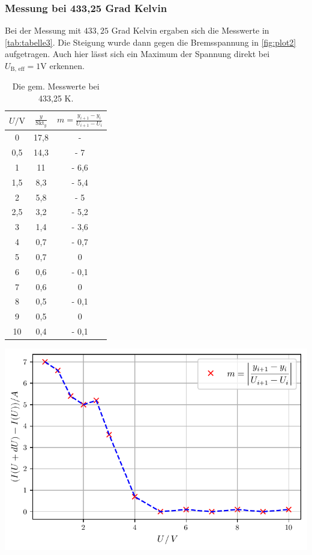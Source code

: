 \subsubsection*{Messung bei 433,25 Grad Kelvin}

Bei der Messung mit $433,25$ Grad Kelvin ergaben sich die Messwerte in \autoref{tab:tabelle3}.
Die Steigung wurde dann gegen die Bremsspannung in \autoref{fig:plot2} aufgetragen.
Auch hier lässt sich ein Maximum der Spannung direkt bei $U_{\text{B, eff}} = 1 \unit\V$ erkennen.

\begin{table}[ht]
  \begin{minipage}[b]{0.4\linewidth}
  \centering
  \begin{tabular}{c c c}
    \toprule
    $U / \unit\V$ & $\frac{y}{\text{Skt}_y}$ & $m  =\frac{y_{i+1} - y_{i}}{U_{i+1} - U_{i}}$ \\
    \midrule 
    0   & 17,8& - \\
    0,5 & 14,3& - 7 \\
    1   & 11  & -  6,6 \\ 
    1,5 & 8,3 & - 5,4 \\ 
    2   & 5,8 & - 5 \\  
    2,5 & 3,2 & - 5,2 \\ 
    3   & 1,4 & - 3,6 \\ 
    4   & 0,7 & - 0,7 \\
    5   & 0,7 & 0 \\  
    6   & 0,6 & - 0,1 \\ 
    7   & 0,6 & 0 \\ 
    8   & 0,5 & -  0,1 \\ 
    9   & 0,5 & 0 \\ 
    10  & 0,4 & -  0,1 \\
    \bottomrule
  \end{tabular}
    \caption{Die gem. Messwerte bei 433,25 K.}
    \label{tab:tabelle3}
  \end{minipage}\hfill
  \begin{minipage}[b]{0.45\linewidth}
  \centering
  \includegraphics[width=\linewidth]{build/plot2.pdf}
  \label{fig:plot2}
  \end{minipage}
\end{table}


